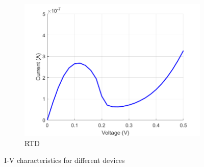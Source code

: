 \documentclass{beamer}
\begin{document}
{\begin{frame}
\begin{figure}
\begin{subfigure}{0.3\textwidth}
     \includegraphics[width=\linewidth]{IV_rtd.png}
     \caption{\scriptsize RTD}
  \end{subfigure}
  \caption{\scriptsize I-V characteristics for different devices}
\end{figure}
          
    \end{frame} 
} 
\end{document}
